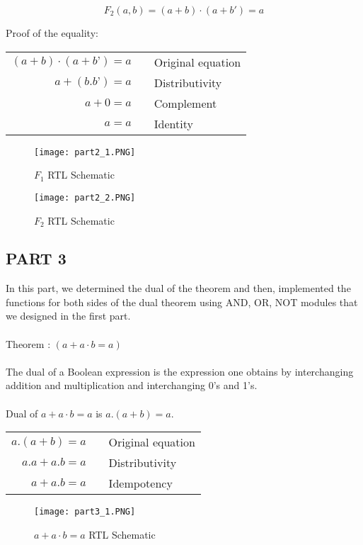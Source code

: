 \documentclass[pdftex,12pt,a4paper]{article}
\begin{document}
\[F_2(a,b)=(a+b)·(a+b')=a\]

Proof of the equality: 
\\

\begin{tabular}{rcl}
\((a + b) · (a + b’ ) = a\)  &  & Original equation \\
\(a + (b . b’) = a \)  &  & Distributivity \\
\(a + 0 = a \)  &  & Complement \\
\(a = a\)  &  & Identity \\
\end{tabular}

\begin{figure}[ht]
	\centering
	\texttt{[image: part2\_1.PNG]}	
	\caption{\(F_1\) RTL Schematic}
	\label{fig4}
\end{figure}

\begin{figure}[ht]
	\centering
	\texttt{[image: part2\_2.PNG]}	
	\caption{\(F_2\) RTL Schematic}
	\label{fig5}
\end{figure}

\clearpage

\subsection{PART 3}
In this part, we determined the dual of the theorem and then, implemented the functions for both sides of the dual theorem using AND, OR, NOT modules that we designed in the first part. \\
\\
Theorem : \((a+a·b=a)\)\\
\\
The dual of a Boolean expression is the expression one obtains by interchanging addition and multiplication and interchanging 0's and 1's.\\
\\
Dual of \(a + a · b = a\) is \( a . (a + b) = a\).\\

\begin{tabular}{rcl}
\(a . (a + b) = a\)& &Original equation\\
\(a . a + a . b = a \)& &Distributivity\\
\(a + a . b = a \)& &Idempotency\\
\end{tabular}


\begin{figure}[hbt!]
	\centering
	\texttt{[image: part3\_1.PNG]}	
	\caption{\(a + a · b = a\) RTL Schematic}
	\label{fig6}
\end{figure}
\end{document}
